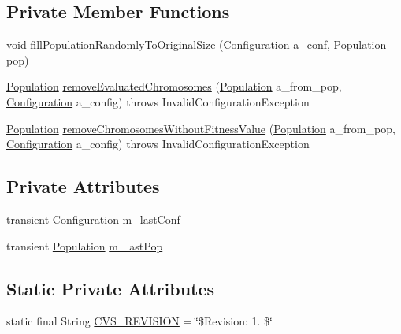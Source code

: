 \subsection*{Private Member Functions}
\begin{DoxyCompactItemize}
\item 
void \hyperlink{classorg_1_1jgap_1_1impl_1_1_g_a_breeder_a636378341fa111d7301b473f973b5fe0}{fill\-Population\-Randomly\-To\-Original\-Size} (\hyperlink{classorg_1_1jgap_1_1_configuration}{Configuration} a\-\_\-conf, \hyperlink{classorg_1_1jgap_1_1_population}{Population} pop)
\item 
\hyperlink{classorg_1_1jgap_1_1_population}{Population} \hyperlink{classorg_1_1jgap_1_1impl_1_1_g_a_breeder_ac03dec72ccf28ed1e768c23e2938abeb}{remove\-Evaluated\-Chromosomes} (\hyperlink{classorg_1_1jgap_1_1_population}{Population} a\-\_\-from\-\_\-pop, \hyperlink{classorg_1_1jgap_1_1_configuration}{Configuration} a\-\_\-config)  throws Invalid\-Configuration\-Exception 
\item 
\hyperlink{classorg_1_1jgap_1_1_population}{Population} \hyperlink{classorg_1_1jgap_1_1impl_1_1_g_a_breeder_ad6ea380ddcc4139ac11c3c792dbb7f1a}{remove\-Chromosomes\-Without\-Fitness\-Value} (\hyperlink{classorg_1_1jgap_1_1_population}{Population} a\-\_\-from\-\_\-pop, \hyperlink{classorg_1_1jgap_1_1_configuration}{Configuration} a\-\_\-config)  throws Invalid\-Configuration\-Exception 
\end{DoxyCompactItemize}
\subsection*{Private Attributes}
\begin{DoxyCompactItemize}
\item 
transient \hyperlink{classorg_1_1jgap_1_1_configuration}{Configuration} \hyperlink{classorg_1_1jgap_1_1impl_1_1_g_a_breeder_a4c1a6917df25082bb61c7d9408cdde6a}{m\-\_\-last\-Conf}
\item 
transient \hyperlink{classorg_1_1jgap_1_1_population}{Population} \hyperlink{classorg_1_1jgap_1_1impl_1_1_g_a_breeder_a73929f7c19c7225866a94822e51e2417}{m\-\_\-last\-Pop}
\end{DoxyCompactItemize}
\subsection*{Static Private Attributes}
\begin{DoxyCompactItemize}
\item 
static final String \hyperlink{classorg_1_1jgap_1_1impl_1_1_g_a_breeder_a456d8e9b7844c837732400b8e8845665}{C\-V\-S\-\_\-\-R\-E\-V\-I\-S\-I\-O\-N} = \char`\"{}\$Revision\-: 1. \$\char`\"{}
\end{DoxyCompactItemize}
